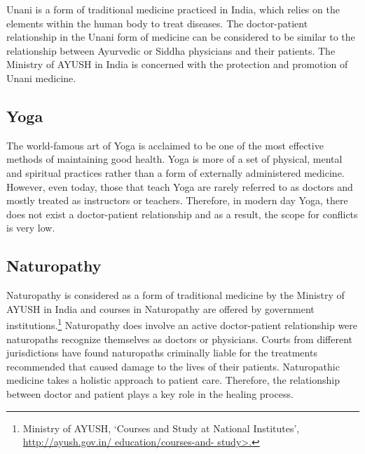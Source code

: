 \begin{multicols}{2}
\vspace{-.2cm}

\noi
Unani is a form of traditional medicine practiced in India, which relies on the elements
within the human body to treat diseases. The doctor-patient relationship in the Unani
form of medicine can be considered to be similar to the relationship between Ayurvedic
or Siddha physicians and their patients. The Ministry of AYUSH in India is concerned
with the protection and promotion of Unani medicine.

\vspace{-.3cm}

\subsection*{Yoga}

\vspace{-.2cm}

\noi
The world-famous art of Yoga is acclaimed to be one of the most effective methods of
maintaining good health. Yoga is more of a set of physical, mental and spiritual practices
rather than a form of externally administered medicine. However, even today, those that
teach Yoga are rarely referred to as doctors and mostly treated as instructors or teachers.
Therefore, in modern day Yoga, there does not exist a doctor-patient relationship and
as a result, the scope for conflicts is very low.

\vspace{-.3cm}

\subsection*{Naturopathy}

\vspace{-.2cm}

\noi
Naturopathy is considered as a form of traditional medicine by the Ministry of AYUSH in India and courses in Naturopathy are offered by government institutions.\footnote{Ministry of AYUSH, ‘Courses and Study at National Institutes’, \url{http://ayush.gov.in/ education/courses-and- study>.}} Naturopathy does involve an active doctor-patient relationship were naturopaths recognize themselves as doctors or physicians. Courts from different jurisdictions have found naturopaths criminally liable for the treatments recommended that caused damage to the lives of their patients. Naturopathic medicine takes a holistic approach to patient care. Therefore, the relationship between doctor and patient plays a key role in the healing process.


\end{multicols}
